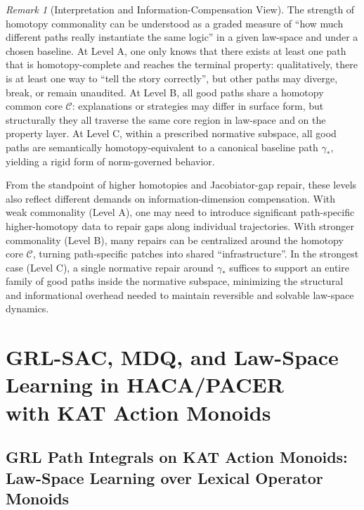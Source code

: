 \documentclass[11pt]{book}
\theoremstyle{plain}
\theoremstyle{definition}
\theoremstyle{remark}
\newtheorem{remark}[theorem]{Remark}
\begin{document}
\begin{remark}[Interpretation and Information-Compensation View]
\label{rem:homotopy-commonality-interpretation}
The strength of homotopy commonality can be understood as a graded measure
of ``how much different paths really instantiate the same logic'' in a
given law-space and under a chosen baseline. At Level A, one only knows
that there exists at least one path that is homotopy-complete and reaches
the terminal property: qualitatively, there is at least one way to ``tell
the story correctly'', but other paths may diverge, break, or remain
unaudited. At Level B, all good paths share a homotopy common core
$\mathcal{C}$: explanations or strategies may differ in surface form, but
structurally they all traverse the same core region in law-space and on
the property layer. At Level C, within a prescribed normative subspace,
all good paths are semantically homotopy-equivalent to a canonical
baseline path $\gamma_\ast$, yielding a rigid form of norm-governed
behavior.

From the standpoint of higher homotopies and Jacobiator-gap repair, these
levels also reflect different demands on information-dimension
compensation. With weak commonality (Level A), one may need to introduce
significant path-specific higher-homotopy data to repair gaps along
individual trajectories. With stronger commonality (Level B), many repairs
can be centralized around the homotopy core $\mathcal{C}$, turning
path-specific patches into shared ``infrastructure''. In the strongest
case (Level C), a single normative repair around $\gamma_\ast$ suffices to
support an entire family of good paths inside the normative subspace,
minimizing the structural and informational overhead needed to maintain
reversible and solvable law-space dynamics.
\end{remark}





\part[GRL-SAC, MDQ, and Law-Space Learning in HACA/PACER]{GRL-SAC, MDQ, and Law-Space Learning in HACA/PACER\\
      with KAT Action Monoids}

\chapter[GRL Path Integrals on KAT Action Monoids]{GRL Path Integrals on KAT Action Monoids:\\
         Law-Space Learning over Lexical Operator Monoids}
\end{document}
